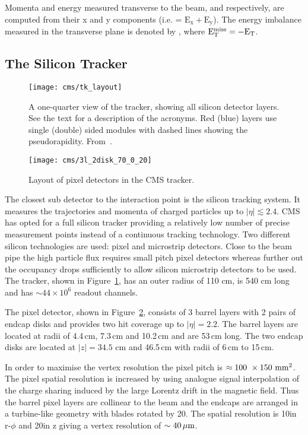 Momenta and energy measured transverse to the beam, \PT and \ET respectively, are computed from their x and y components (i.e. \ET = $\mathrm{E_x + E_y}$). The energy imbalance measured in the transverse plane is denoted by \MET, where $\mathrm{E_{T}^{miss}} = -\mathrm{E_{\mathrm{T}}}$.

\subsection{The Silicon Tracker}

\begin{figure}[tb]
  \centering
  \texttt{[image: cms/tk\_layout]}
  \caption{A one-quarter view of the tracker, showing all silicon detector layers. See the text for a description of the acronyms. Red (blue) layers use single (double) sided modules with dashed lines showing the pseudorapidity. From~\cite{CMS_TDR_PHYS_vol1}.
  \label{fig:tracker}}
\end{figure}

\begin{figure}[tb]
  \centering
  \texttt{[image: cms/3l\_2disk\_70\_0\_20]}
  \caption{Layout of pixel detectors in the CMS tracker.~\cite{CMS_TDR_PHYS_vol1}\label{fig:pixels}}
\end{figure}

The closest sub detector to the interaction point is the silicon tracking system. It measures the trajectories and momenta of charged particles up to $|\eta| \lesssim 2.4$. CMS has opted for a full silicon tracker providing a relatively low number of precise measurement points instead of a continuous tracking technology. Two different silicon technologies are used: pixel and microstrip detectors. Close to the beam pipe the high particle flux requires small pitch pixel detectors whereas further out the occupancy drops sufficiently to allow silicon microstrip detectors to be used. The tracker, shown in Figure~\ref{fig:tracker}, has an outer radius of 110 cm, is 540 cm long and has $\sim44\times10^{6}$ readout channels. 

The pixel detector, shown in Figure~\ref{fig:pixels}, consists of 3 barrel layers with 2 pairs of endcap disks and provides two hit coverage up to $|\eta| = 2.2$. The barrel layers are located at radii of 4.4\,cm, 7.3\,cm and 10.2\,cm and are 53\,cm long. The two endcap disks are located at $|z| = 34.5$ cm and 46.5\,cm with radii of 6\,cm to 15\,cm.

In order to maximise the vertex resolution the pixel pitch is $\approx100~\times150~\mathrm{mm^{\mathrm{2}}}$. The pixel spatial resolution is increased by using analogue signal interpolation of the charge sharing induced by the large Lorentz drift in the magnetic field. Thus the barrel pixel layers are collinear to the beam and the endcaps are arranged in a turbine-like geometry with blades rotated by 20\de. The spatial resolution is 10\micron in r-$\phi$ and 20\micron in z giving a vertex resolution of $\sim40\,\mu \mathrm{m}$.

